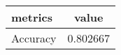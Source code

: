 \begin{tabular}{|l|c|}
\hline
 metrics &    value \\ \hline

Accuracy & 0.802667 \\ \hline

\end{tabular}
